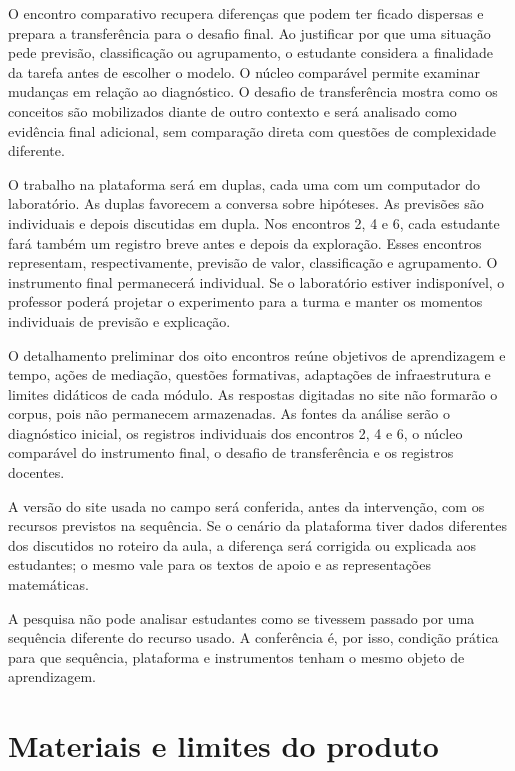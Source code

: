O encontro comparativo recupera diferenças que podem ter ficado dispersas e prepara a transferência para o desafio final. Ao justificar por que uma situação pede previsão, classificação ou agrupamento, o estudante considera a finalidade da tarefa antes de escolher o modelo. O núcleo comparável permite examinar mudanças em relação ao diagnóstico. O desafio de transferência mostra como os conceitos são mobilizados diante de outro contexto e será analisado como evidência final adicional, sem comparação direta com questões de complexidade diferente.

O trabalho na plataforma será em duplas, cada uma com um computador do laboratório. As duplas favorecem a conversa sobre hipóteses. As previsões são individuais e depois discutidas em dupla. Nos encontros 2, 4 e 6, cada estudante fará também um registro breve antes e depois da exploração. Esses encontros representam, respectivamente, previsão de valor, classificação e agrupamento. O instrumento final permanecerá individual. Se o laboratório estiver indisponível, o professor poderá projetar o experimento para a turma e manter os momentos individuais de previsão e explicação.

O detalhamento preliminar dos oito encontros reúne objetivos de aprendizagem e tempo, ações de mediação, questões formativas, adaptações de infraestrutura e limites didáticos de cada módulo. As respostas digitadas no site não formarão o corpus, pois não permanecem armazenadas. As fontes da análise serão o diagnóstico inicial, os registros individuais dos encontros 2, 4 e 6, o núcleo comparável do instrumento final, o desafio de transferência e os registros docentes.

A versão do site usada no campo será conferida, antes da intervenção, com os recursos previstos na sequência. Se o cenário da plataforma tiver dados diferentes dos discutidos no roteiro da aula, a diferença será corrigida ou explicada aos estudantes; o mesmo vale para os textos de apoio e as representações matemáticas.

A pesquisa não pode analisar estudantes como se tivessem passado por uma sequência diferente do recurso usado. A conferência é, por isso, condição prática para que sequência, plataforma e instrumentos tenham o mesmo objeto de aprendizagem.

\section{Materiais e limites do produto}

